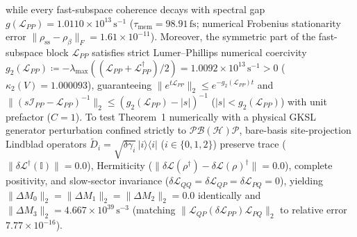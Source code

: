 \documentclass[10pt,letterpaper]{article}
\newcommand{\Lcal}{\mathcal{L}}
\newcommand{\Pcal}{\mathcal{P}}
\newcommand{\Hcal}{\mathcal{H}}
\newcommand{\Bcal}{\mathcal{B}}
\begin{document}
while every fast-subspace coherence decays with spectral gap $g(\Lcal_{PP}) = 1.0110 \times 10^{13}\,\mathrm{s}^{-1}$ ($\tau_{\mathrm{mem}} = 98.91\,\mathrm{fs}$; numerical Frobenius stationarity error $\|\rho_{\mathrm{ss}} - \rho_\beta\|_F = 1.61 \times 10^{-11}$). Moreover, the symmetric part of the fast-subspace block $\Lcal_{PP}$ satisfies strict Lumer--Phillips numerical coercivity $g_2(\Lcal_{PP}) \coloneqq -\lambda_{\max}((\Lcal_{PP}+\Lcal_{PP}^\dagger)/2) = 1.0092 \times 10^{13}\,\mathrm{s}^{-1} > 0$ ($\kappa_2(V) = 1.000093$), guaranteeing $\|e^{t\Lcal_{PP}}\|_2 \le e^{-g_2(\Lcal_{PP})t}$ and $\|(s\mathcal{I}_{PP}-\Lcal_{PP})^{-1}\|_2 \le (g_2(\Lcal_{PP}) - |s|)^{-1}$ ($|s| < g_2(\Lcal_{PP})$) with unit prefactor ($C = 1$). To test Theorem~1 numerically with a physical GKSL generator perturbation confined strictly to $\Pcal\Bcal(\Hcal)\Pcal$, bare-basis site-projection Lindblad operators $\widetilde{D}_i = \sqrt{\delta\gamma_i}\,|i\rangle\langle i|$ ($i \in \{0,1,2\}$) preserve trace ($\|\delta\Lcal^\dagger(\mathbb{I})\| = 0.0$), Hermiticity ($\|\delta\Lcal(\rho^\dagger) - \delta\Lcal(\rho)^\dagger\| = 0.0$), complete positivity, and slow-sector invariance ($\delta\Lcal_{QQ}=\delta\Lcal_{QP}=\delta\Lcal_{PQ}=0$), yielding $\|\Delta M_0\|_2 = \|\Delta M_1\|_2 = \|\Delta M_2\|_2 = 0.0$ identically and $\|\Delta M_3\|_2 = 4.667 \times 10^{39}\,\mathrm{s}^{-3}$ (matching $\|\Lcal_{QP}(\delta\Lcal_{PP})\Lcal_{PQ}\|_2$ to relative error $7.77 \times 10^{-16}$).
\end{document}

